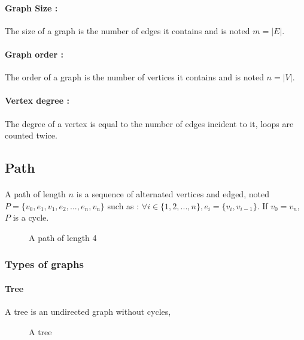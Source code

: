\paragraph{Graph Size :}
The size of a graph is the number of edges it contains and is noted
$m = |E|$.

\paragraph{Graph order :}
The order of a graph is the number of vertices it contains and is noted
$n = |V|$.

\paragraph{Vertex degree :}
The degree of a vertex is equal to the number of edges incident to it, loops
are counted twice.

\subsection{Path}
\paragraph{}
A path of length $n$ is a sequence of alternated vertices and edged, noted
$P = \{v_0, e_1, v_1, e_2, ..., e_n, v_n\}$ such as :
$\forall i \in \{1,2, ..., n\}, e_i = \{v_i, v_{i-1}\}$. If $v_0 = v_n$, $P$ is
a cycle.

\begin{figure}[!h]
  \begin{center}
    
  \end{center}
  \caption{A path of length 4}
\end{figure}




\subsubsection{Types of graphs}

\paragraph{Tree}
A tree is an undirected graph without cycles,

\begin{figure}[!h]
  \begin{center}
    
  \end{center}
  \caption{A tree}
\end{figure}

